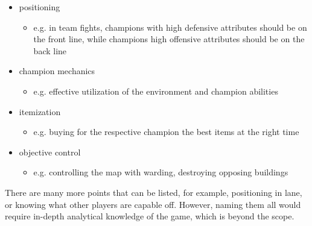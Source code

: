 \begin{itemize}
	\item positioning
	\begin{itemize}
		\item e.g. in team fights, champions with high defensive attributes should be on the front line, while champions high offensive attributes should be on the back line
	\end{itemize}
	\item champion mechanics
		\begin{itemize}
			\item e.g. effective utilization of the environment and champion abilities
		\end{itemize}
	\item itemization
		\begin{itemize}
			\item e.g. buying for the respective champion the best items at the right time 
		\end{itemize}
	\item objective control
		\begin{itemize}
			\item e.g. controlling the map with warding, destroying opposing buildings \cite{Challeng53:online}
		\end{itemize}
\end{itemize}

There are many more points that can be listed, for example, positioning in lane, or knowing what other players are capable off. However, naming them all would require in-depth analytical knowledge of the game, which is beyond the scope.

